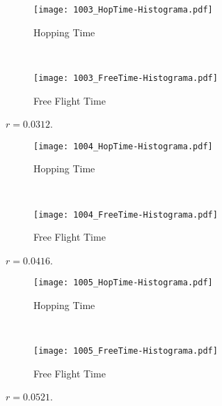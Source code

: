\documentclass[a4paper,10pt]{article}
\begin{document}
\begin{figure}[h]
        \centering
        \begin{subfigure}[b]{0.45\textwidth}
                \centering
                \texttt{[image: 1003\_HopTime-Histograma.pdf]}
                \caption{Hopping Time}              
        \end{subfigure}%
        ~ %
        \begin{subfigure}[b]{0.45\textwidth}
                \centering
                \texttt{[image: 1003\_FreeTime-Histograma.pdf]}
                \caption{Free Flight Time}                
        \end{subfigure}       
        \caption{ $r=0.0312$. }
\end{figure}




\begin{figure}[h]
        \centering
        \begin{subfigure}[b]{0.45\textwidth}
                \centering
                \texttt{[image: 1004\_HopTime-Histograma.pdf]}
                \caption{Hopping Time}              
        \end{subfigure}%
        ~ %
        \begin{subfigure}[b]{0.45\textwidth}
                \centering
                \texttt{[image: 1004\_FreeTime-Histograma.pdf]}
                \caption{Free Flight Time}                
        \end{subfigure}       
        \caption{ $r=0.0416$. }
\end{figure}



\begin{figure}[h]
        \centering
        \begin{subfigure}[b]{0.45\textwidth}
                \centering
                \texttt{[image: 1005\_HopTime-Histograma.pdf]}
                \caption{Hopping Time}              
        \end{subfigure}%
        ~ %
        \begin{subfigure}[b]{0.45\textwidth}
                \centering
                \texttt{[image: 1005\_FreeTime-Histograma.pdf]}
                \caption{Free Flight Time}                
        \end{subfigure}       
        \caption{ $r=0.0521$. }
\end{figure}
\end{document}
